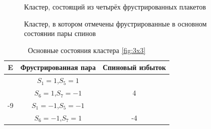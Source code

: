 \documentclass[utf8, babel, sor, jor, amsmath, amssymb, reprint]{elsarticle} %
\begin{document}
\begin{figure}
	\centering
	\caption{Кластер, состоящий из четырёх фрустрированных плакетов}
	\label{fig:cl}
\end{figure}

\begin{figure}
	\centering
	\caption{Кластер, в котором отмечены фрустрированные в основном состоянии пары спинов}
	\label{fig:clF}
\end{figure}

\begin{table}[h]
	\centering
	\begin{tabular}{|c|c|c|}
		\hline
		E   &   Фрустрированная пара & Спиновый избыток\\
		\hline
		   &  $S_1=1$,$S_5=1$&\\
		&    $S_6=1$,$S_7=-1$ & 4\\
	\cline{2-3}
		-9	\multirow{3}{*}{}
		   &  $S_1=-1$,$S_5=-1$&\\
		&    $S_6=-1$,$S_7=1$ & -4\\
		\hline
	\end{tabular}
	\caption{Основные состояния кластера \ref{fig:3x3}}
	\label{tab:gscl}
\end{table} 
\end{document}
